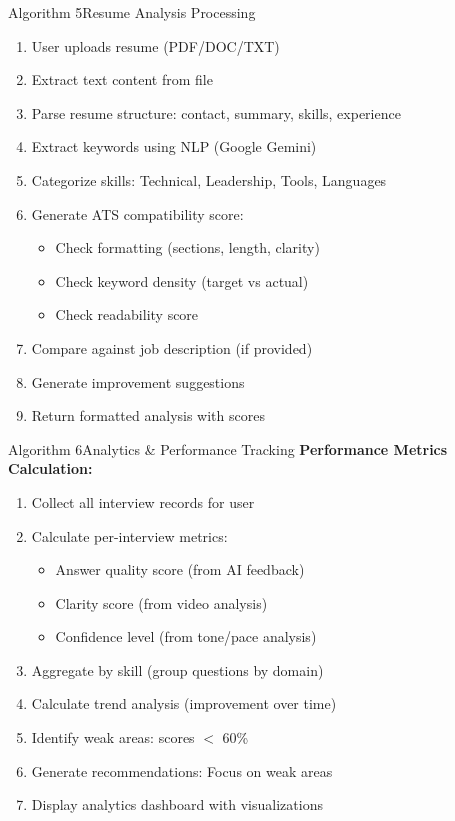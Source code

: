 \documentclass{beamer}
\begin{document}
\begin{frame}{Algorithm 5}{Resume Analysis Processing}
\begin{enumerate}
    \item User uploads resume (PDF/DOC/TXT)
    \item Extract text content from file
    \item Parse resume structure: contact, summary, skills, experience
    \item Extract keywords using NLP (Google Gemini)
    \item Categorize skills: Technical, Leadership, Tools, Languages
    \item Generate ATS compatibility score:
    \begin{itemize}
        \item Check formatting (sections, length, clarity)
        \item Check keyword density (target vs actual)
        \item Check readability score
    \end{itemize}
    \item Compare against job description (if provided)
    \item Generate improvement suggestions
    \item Return formatted analysis with scores
\end{enumerate}
\end{frame}

\begin{frame}{Algorithm 6}{Analytics \& Performance Tracking}
\textbf{Performance Metrics Calculation:}
\begin{enumerate}
    \item Collect all interview records for user
    \item Calculate per-interview metrics:
    \begin{itemize}
        \item Answer quality score (from AI feedback)
        \item Clarity score (from video analysis)
        \item Confidence level (from tone/pace analysis)
    \end{itemize}
    \item Aggregate by skill (group questions by domain)
    \item Calculate trend analysis (improvement over time)
    \item Identify weak areas: scores $<$ 60\%
    \item Generate recommendations: Focus on weak areas
    \item Display analytics dashboard with visualizations
\end{enumerate}
\end{frame}
\end{document}
